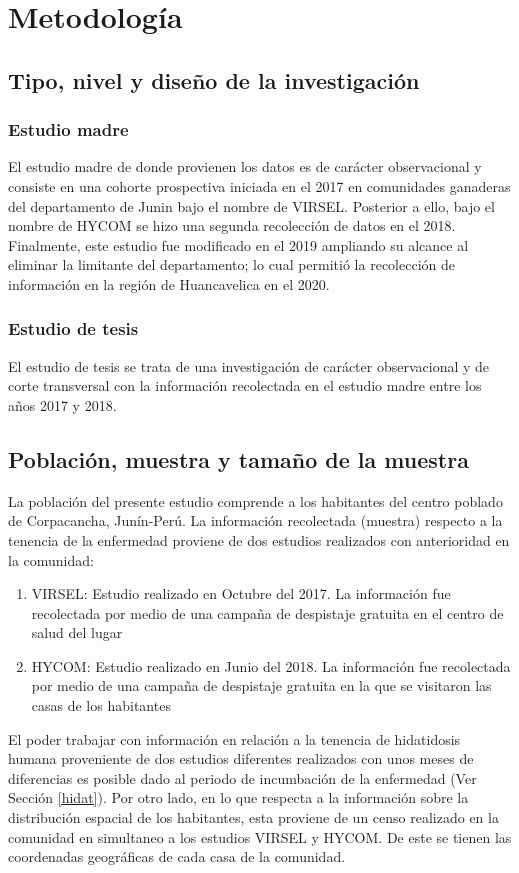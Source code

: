 \section{Metodología}
\subsection{Tipo, nivel y diseño de la investigación}
\subsubsection*{Estudio madre}
El estudio madre de donde provienen los datos es de carácter observacional y consiste en una cohorte prospectiva iniciada en el 2017 en comunidades ganaderas del departamento de Junin bajo el nombre de VIRSEL. Posterior a ello, bajo el nombre de HYCOM se hizo una segunda recolección de datos en el 2018. Finalmente, este estudio fue modificado en el 2019 ampliando su alcance al eliminar la limitante del departamento; lo cual permitió la recolección de información en la región de Huancavelica en el 2020.
\subsubsection*{Estudio de tesis}
El estudio de tesis se trata de una investigación de carácter observacional y de corte transversal con la información recolectada en el estudio madre entre los años 2017 y 2018.

\subsection{Población, muestra y tamaño de la muestra}
La población del presente estudio comprende a los habitantes del centro poblado de Corpacancha, Junín-Perú. La información recolectada (muestra) respecto a la tenencia de la enfermedad proviene de dos estudios realizados con anterioridad en la comunidad:
\begin{enumerate}
	\item VIRSEL: Estudio realizado en Octubre del 2017. La información fue recolectada por medio de una campaña de despistaje gratuita en el centro de salud del lugar
	\item HYCOM: Estudio realizado en Junio del 2018. La información fue recolectada por medio de una campaña de despistaje gratuita en la que se visitaron las casas de los habitantes
\end{enumerate}
El poder trabajar con información en relación a la tenencia de hidatidosis humana proveniente de dos estudios diferentes realizados con unos meses de diferencias es posible dado al periodo de incumbación de la enfermedad (Ver Sección \ref{hidat}). Por otro lado, en lo que respecta a la información sobre la distribución espacial de los habitantes, esta proviene de un censo realizado en la comunidad en simultaneo a los estudios VIRSEL y HYCOM. De este se tienen las coordenadas geográficas de cada casa de la comunidad.

